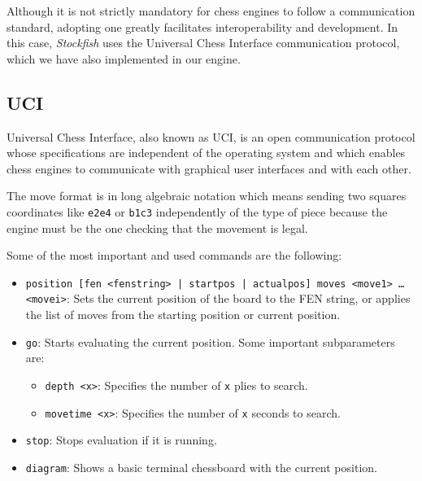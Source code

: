 \vspace{1em}

\noindent Although it is not strictly mandatory for chess engines to follow a communication standard, adopting one greatly facilitates interoperability and development. In this case, \textit{Stockfish} uses the Universal Chess Interface communication protocol, which we have also implemented in our engine.

\subsection{UCI}

Universal Chess Interface, also known as UCI, is an open communication protocol whose specifications are independent of the operating system and which enables chess engines to communicate with graphical user interfaces and with each other.

\vspace{1em}

\noindent The move format is in long algebraic notation which means sending two squares coordinates like \texttt{e2e4} or \texttt{b1c3} independently of the type of piece because the engine must be the one checking that the movement is legal.

\vspace{1em}

\noindent Some of the most important and used commands are the following:

\begin{itemize}[itemsep=1pt]
    \item \texttt{position [fen <fenstring> | startpos | actualpos] moves <move1> \ldots \\<movei>}: Sets the current position of the board to the FEN string, or applies the list of moves from the starting position or current position.

    \item \texttt{go}: Starts evaluating the current position. Some important subparameters are:
    \begin{itemize}[itemsep=1pt]
        \item \texttt{depth <x>}: Specifies the number of \texttt{x} plies to search.
        \item \texttt{movetime <x>}: Specifies the number of \texttt{x} seconds to search. 
    \end{itemize}

    \item \texttt{stop}: Stops evaluation if it is running.
    \item \texttt{diagram}: Shows a basic terminal chessboard with the current position.
\end{itemize}


